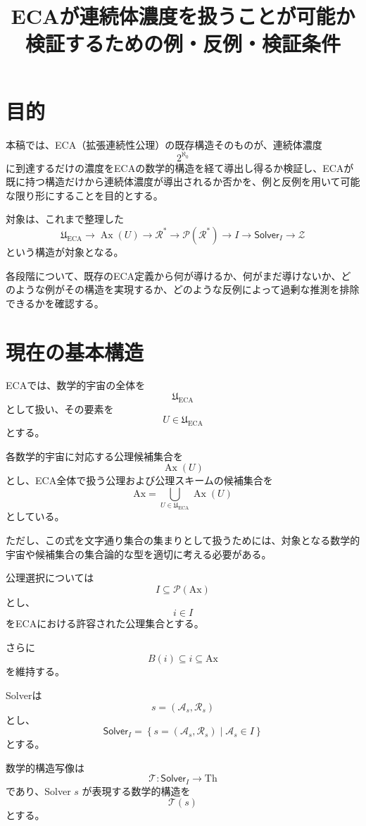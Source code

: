\documentclass[a4paper,11pt]{article}
\title{ECAが連続体濃度を扱うことが可能か検証するための例・反例・検証条件}
\author{}
\date{}
\newcommand{\Ax}{\mathrm{Ax}}
\newcommand{\Solver}{\mathsf{Solver}}
\newcommand{\Th}{\mathrm{Th}}
\begin{document}
\maketitle

\section{目的}

本稿では、ECA（拡張連続性公理）の既存構造そのものが、連続体濃度
\[
2^{\aleph_0}
\]
に到達するだけの濃度をECAの数学的構造を経て導出し得るか検証し、ECAが既に持つ構造だけから連続体濃度が導出されるか否かを、例と反例を用いて可能な限り形にすることを目的とする。


対象は、これまで整理した
\[
\mathfrak U_{\mathrm{ECA}}
\longrightarrow
\operatorname{Ax}(U)
\longrightarrow
\mathcal{R}^*
\longrightarrow
\mathcal{P}(\mathcal{R}^*)
\longrightarrow
I
\longrightarrow
\Solver_I
\longrightarrow
\mathcal{Z}
\]
という構造が対象となる。

各段階について、既存のECA定義から何が導けるか、何がまだ導けないか、どのような例がその構造を実現するか、どのような反例によって過剰な推測を排除できるかを確認する。

\section{現在の基本構造}

ECAでは、数学的宇宙の全体を
\[
\mathfrak U_{\mathrm{ECA}}
\]
として扱い、その要素を
\[
U\in\mathfrak U_{\mathrm{ECA}}
\]
とする。

各数学的宇宙に対応する公理候補集合を
\[
\operatorname{Ax}(U)
\]
とし、ECA全体で扱う公理および公理スキームの候補集合を
\[
\Ax
=
\bigcup_{U\in\mathfrak U_{\mathrm{ECA}}}\operatorname{Ax}(U)
\]
としている。

ただし、この式を文字通り集合の集まりとして扱うためには、対象となる数学的宇宙や候補集合の集合論的な型を適切に考える必要がある。

公理選択については
\[
I\subseteq\mathcal{P}(\Ax)
\]
とし、
\[
i\in I
\]
をECAにおける許容された公理集合とする。

さらに
\[
B(i)\subseteq i\subseteq\Ax
\]
を維持する。

Solverは
\[
s=(\mathcal{A}_s,\mathcal{R}_s)
\]
とし、
\[
\Solver_I
=
\left\{
s=(\mathcal{A}_s,\mathcal{R}_s)
\mid
\mathcal{A}_s\in I
\right\}
\]
とする。

数学的構造写像は
\[
\mathcal{T}:\Solver_I\to\Th
\]
であり、Solver $s$ が表現する数学的構造を
\[
\mathcal{T}(s)
\]
とする。
\end{document}
